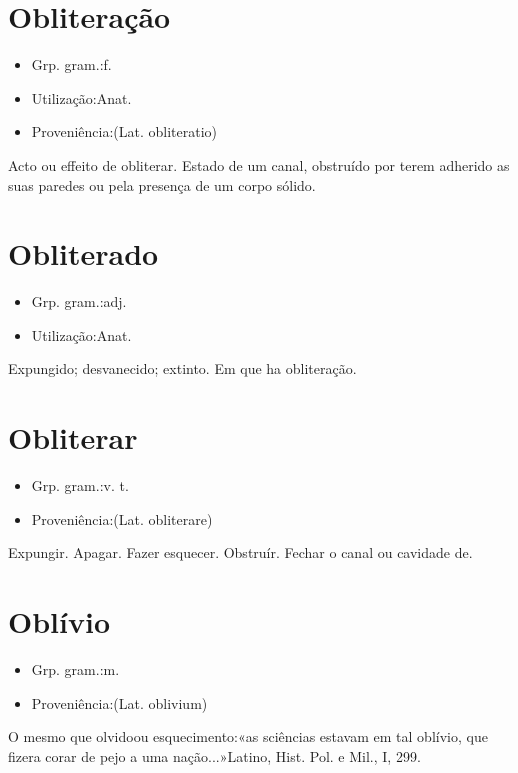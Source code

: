 \section{Obliteração}
\begin{itemize}
\item {Grp. gram.:f.}
\end{itemize}
\begin{itemize}
\item {Utilização:Anat.}
\end{itemize}
\begin{itemize}
\item {Proveniência:(Lat. \textunderscore obliteratio\textunderscore )}
\end{itemize}
Acto ou effeito de obliterar.
Estado de um canal, obstruído por terem adherido as suas paredes ou pela presença de um corpo sólido.
\section{Obliterado}
\begin{itemize}
\item {Grp. gram.:adj.}
\end{itemize}
\begin{itemize}
\item {Utilização:Anat.}
\end{itemize}
Expungido; desvanecido; extinto.
Em que ha obliteração.
\section{Obliterar}
\begin{itemize}
\item {Grp. gram.:v. t.}
\end{itemize}
\begin{itemize}
\item {Proveniência:(Lat. \textunderscore obliterare\textunderscore )}
\end{itemize}
Expungir.
Apagar.
Fazer esquecer.
Obstruír.
Fechar o canal ou cavidade de.
\section{Oblívio}
\begin{itemize}
\item {Grp. gram.:m.}
\end{itemize}
\begin{itemize}
\item {Proveniência:(Lat. \textunderscore oblivium\textunderscore )}
\end{itemize}
O mesmo que \textunderscore olvido\textunderscore  ou \textunderscore esquecimento\textunderscore :«\textunderscore as sciências estavam em tal oblívio, que fizera corar de pejo a uma nação...\textunderscore »Latino, \textunderscore Hist. Pol. e Mil.\textunderscore , I, 299.
